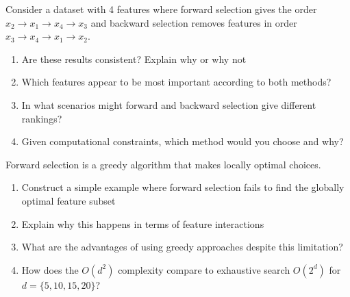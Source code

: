 \documentclass{article}
\newcounter{exercise}
\begin{document}
\begin{tcolorbox}[colback=blue!5!white,colframe=blue!75!black,title=\textbf{Exercise \theexercise: Forward vs Backward Selection Comparison}]
Consider a dataset with 4 features where forward selection gives the order $x_2 \to x_1 \to x_4 \to x_3$ and backward selection removes features in order $x_3 \to x_4 \to x_1 \to x_2$.

\begin{enumerate}[label=(\alph*)]
    \item Are these results consistent? Explain why or why not
    \item Which features appear to be most important according to both methods?
    \item In what scenarios might forward and backward selection give different rankings?
    \item Given computational constraints, which method would you choose and why?
\end{enumerate}
\end{tcolorbox}

\begin{tcolorbox}[colback=blue!5!white,colframe=blue!75!black,title=\textbf{Exercise \theexercise: Greedy Algorithm Limitations}]
Forward selection is a greedy algorithm that makes locally optimal choices.

\begin{enumerate}[label=(\alph*)]
    \item Construct a simple example where forward selection fails to find the globally optimal feature subset
    \item Explain why this happens in terms of feature interactions
    \item What are the advantages of using greedy approaches despite this limitation?
    \item How does the $O(d^2)$ complexity compare to exhaustive search $O(2^d)$ for $d = \{5, 10, 15, 20\}$?
\end{enumerate}
\end{tcolorbox}
\end{document}
